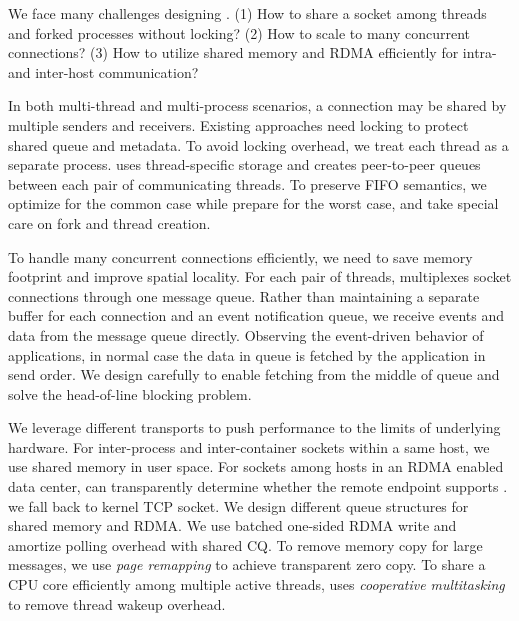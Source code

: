 We face many challenges designing \sys{}. 
(1) How to share a socket among threads and forked processes without locking?
(2) How to scale to many concurrent connections?
(3) How to utilize shared memory and RDMA efficiently for intra- and inter-host communication?

In both multi-thread and multi-process scenarios, a connection may be shared by multiple senders and receivers.
Existing approaches need locking to protect shared queue and metadata.
To avoid locking overhead, we treat each thread as a separate process.
\libipc{} uses thread-specific storage and creates peer-to-peer queues between each pair of communicating threads.
To preserve FIFO semantics, we optimize for the common case while prepare for the worst case, and take special care on fork and thread creation.

To handle many concurrent connections efficiently, we need to save memory footprint and improve spatial locality.
For each pair of threads, \sys multiplexes socket connections through one message queue.
Rather than maintaining a separate buffer for each connection and an event notification queue, we receive events and data from the message queue directly.
Observing the event-driven behavior of applications, in normal case the data in queue is fetched by the application in send order.
We design carefully to enable fetching from the middle of queue and solve the head-of-line blocking problem.

We leverage different transports to push performance to the limits of underlying hardware.
For inter-process and inter-container sockets within a same host, we use shared memory in user space.
For sockets among hosts in an RDMA enabled data center, \sys can transparently determine whether the remote endpoint supports \sys.
we fall back to kernel TCP socket.
We design different queue structures for shared memory and RDMA.
We use batched one-sided RDMA write and amortize polling overhead with shared CQ.
To remove memory copy for large messages, we use \emph{page remapping} to achieve transparent zero copy.
To share a CPU core efficiently among multiple active threads, \sys uses \emph{cooperative multitasking} to remove thread wakeup overhead.

\fi


